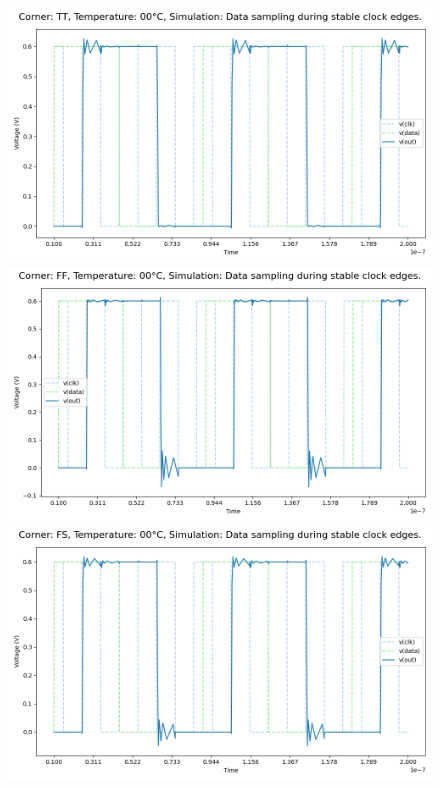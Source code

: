 \begin{figure}[H]
    \centering
    \includegraphics[height= 0.21\textheight]{figures/aimspice/TT00W2.png}
    \vspace{5pt}
    \includegraphics[height= 0.21\textheight]{figures/aimspice/FF00W2.png}
    \vspace{5pt}
    \includegraphics[height= 0.21\textheight]{figures/aimspice/FS00W2.png}

\end{figure}
